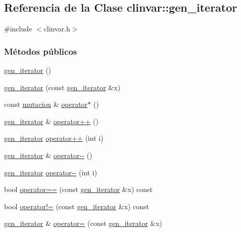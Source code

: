 \hypertarget{classclinvar_1_1gen__iterator}{}\subsection{Referencia de la Clase clinvar\+:\+:gen\+\_\+iterator}
\label{classclinvar_1_1gen__iterator}


{\ttfamily \#include $<$clinvar.\+h$>$}

\subsubsection*{Métodos públicos}
\begin{DoxyCompactItemize}
\item 
\hyperlink{classclinvar_1_1gen__iterator_aeaec836fe40cb0107df3aa36ce3fd145}{gen\+\_\+iterator} ()
\item 
\hyperlink{classclinvar_1_1gen__iterator_ac778967e194ccc3fe472d6f963ca353a}{gen\+\_\+iterator} (const \hyperlink{classclinvar_1_1gen__iterator}{gen\+\_\+iterator} \&x)
\item 
const \hyperlink{classmutacion}{mutacion} \& \hyperlink{classclinvar_1_1gen__iterator_a4059eeff26226f7c2805cf2c2f0c970b}{operator$\ast$} ()
\item 
\hyperlink{classclinvar_1_1gen__iterator}{gen\+\_\+iterator} \& \hyperlink{classclinvar_1_1gen__iterator_a372a1e60c2ed48011bfb16aa4182077a}{operator++} ()
\item 
\hyperlink{classclinvar_1_1gen__iterator}{gen\+\_\+iterator} \hyperlink{classclinvar_1_1gen__iterator_a867ff16a5cdbad584e401f9d855c1b06}{operator++} (int i)
\item 
\hyperlink{classclinvar_1_1gen__iterator}{gen\+\_\+iterator} \& \hyperlink{classclinvar_1_1gen__iterator_ade271083e6eb818b9655fb643f222435}{operator-\/-\/} ()
\item 
\hyperlink{classclinvar_1_1gen__iterator}{gen\+\_\+iterator} \hyperlink{classclinvar_1_1gen__iterator_a072a2c2afc477055c340736985bea9c5}{operator-\/-\/} (int i)
\item 
bool \hyperlink{classclinvar_1_1gen__iterator_a163499189b057d30cf61b43bf89648ab}{operator==} (const \hyperlink{classclinvar_1_1gen__iterator}{gen\+\_\+iterator} \&x) const 
\item 
bool \hyperlink{classclinvar_1_1gen__iterator_a935a686f902ac01a94d3360c4f2cbc62}{operator!=} (const \hyperlink{classclinvar_1_1gen__iterator}{gen\+\_\+iterator} \&x) const 
\item 
\hyperlink{classclinvar_1_1gen__iterator}{gen\+\_\+iterator} \& \hyperlink{classclinvar_1_1gen__iterator_af65e89f38690e967390f0ed1cd01a546}{operator=} (const \hyperlink{classclinvar_1_1gen__iterator}{gen\+\_\+iterator} \&x)
\end{DoxyCompactItemize}
